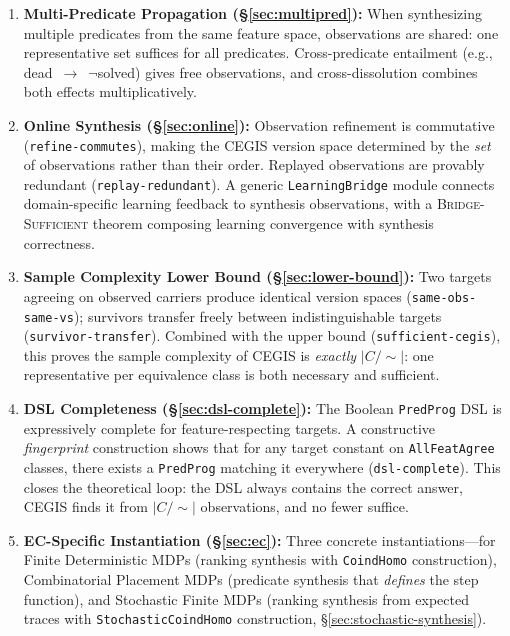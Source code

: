 \documentclass[9pt,a4paper]{article}
\theoremstyle{plain}
\theoremstyle{definition}
\theoremstyle{remark}
\begin{document}
\begin{enumerate}
\item \textbf{Multi-Predicate Propagation (\S\ref{sec:multipred}):} When synthesizing multiple predicates from the same feature space, observations are shared: one representative set suffices for all predicates.  Cross-predicate entailment (e.g., dead~$\to$~$\neg$solved) gives free observations, and cross-dissolution combines both effects multiplicatively.

\item \textbf{Online Synthesis (\S\ref{sec:online}):} Observation refinement is commutative (\texttt{refine-commutes}), making the CEGIS version space determined by the \emph{set} of observations rather than their order.  Replayed observations are provably redundant (\texttt{replay-redundant}).  A generic \texttt{LearningBridge} module connects domain-specific learning feedback to synthesis observations, with a \textsc{Bridge-Sufficient} theorem composing learning convergence with synthesis correctness.

\item \textbf{Sample Complexity Lower Bound (\S\ref{sec:lower-bound}):} Two targets agreeing on observed carriers produce identical version spaces (\texttt{same-obs-same-vs}); survivors transfer freely between indistinguishable targets (\texttt{survivor-transfer}).  Combined with the upper bound (\texttt{sufficient-cegis}), this proves the sample complexity of CEGIS is \emph{exactly} $|C/{\sim}|$: one representative per equivalence class is both necessary and sufficient.

\item \textbf{DSL Completeness (\S\ref{sec:dsl-complete}):} The Boolean \texttt{PredProg} DSL is expressively complete for feature-respecting targets.  A constructive \emph{fingerprint} construction shows that for any target constant on \texttt{AllFeatAgree} classes, there exists a \texttt{PredProg} matching it everywhere (\texttt{dsl-complete}).  This closes the theoretical loop: the DSL always contains the correct answer, CEGIS finds it from $|C/{\sim}|$ observations, and no fewer suffice.

\item \textbf{EC-Specific Instantiation (\S\ref{sec:ec}):} Three concrete instantiations---for Finite Deterministic MDPs (ranking synthesis with \texttt{CoindHomo} construction), Combinatorial Placement MDPs (predicate synthesis that \emph{defines} the step function), and Stochastic Finite MDPs (ranking synthesis from expected traces with \texttt{StochasticCoindHomo} construction, \S\ref{sec:stochastic-synthesis}).


\end{enumerate}
\end{document}
